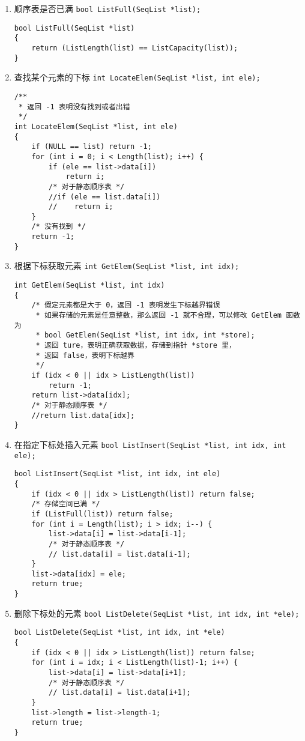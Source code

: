 \documentclass{ctexart}
\begin{document}
\begin{enumerate}
\item 顺序表是否已满 \texttt{bool ListFull(SeqList *list);}
\begin{verbatim}
bool ListFull(SeqList *list)
{
    return (ListLength(list) == ListCapacity(list));
}
\end{verbatim}

\item 查找某个元素的下标 \texttt{int LocateElem(SeqList *list, int ele);}
\begin{verbatim}
/**
 * 返回 -1 表明没有找到或者出错
 */
int LocateElem(SeqList *list, int ele)
{
    if (NULL == list) return -1;
    for (int i = 0; i < Length(list); i++) {
        if (ele == list->data[i])
            return i;
        /* 对于静态顺序表 */
        //if (ele == list.data[i])
        //    return i;
    }
    /* 没有找到 */
    return -1;
}
\end{verbatim}

\item 根据下标获取元素 \texttt{int GetElem(SeqList *list, int idx);}
\begin{verbatim}
int GetElem(SeqList *list, int idx)
{
    /* 假定元素都是大于 0，返回 -1 表明发生下标越界错误
     * 如果存储的元素是任意整数，那么返回 -1 就不合理，可以修改 GetElem 函数为
     * bool GetElem(SeqList *list, int idx, int *store);
     * 返回 ture，表明正确获取数据，存储到指针 *store 里，
     * 返回 false，表明下标越界
     */
    if (idx < 0 || idx > ListLength(list))
        return -1;
    return list->data[idx];
    /* 对于静态顺序表 */
    //return list.data[idx];
}
\end{verbatim}

\item 在指定下标处插入元素 \texttt{bool ListInsert(SeqList *list, int idx, int ele);}
\begin{verbatim}
bool ListInsert(SeqList *list, int idx, int ele)
{
    if (idx < 0 || idx > ListLength(list)) return false;
    /* 存储空间已满 */
    if (ListFull(list)) return false;
    for (int i = Length(list); i > idx; i--) {
        list->data[i] = list->data[i-1];
        /* 对于静态顺序表 */
        // list.data[i] = list.data[i-1];
    }
    list->data[idx] = ele;
    return true;
}
\end{verbatim}

\item 删除下标处的元素 \texttt{bool ListDelete(SeqList *list, int idx, int *ele);}
\begin{verbatim}
bool ListDelete(SeqList *list, int idx, int *ele)
{
    if (idx < 0 || idx > ListLength(list)) return false;
    for (int i = idx; i < ListLength(list)-1; i++) {
        list->data[i] = list->data[i+1];
        /* 对于静态顺序表 */
        // list.data[i] = list.data[i+1];
    }
    list->length = list->length-1;
    return true;
}
\end{verbatim}
\end{enumerate}
\end{document}
